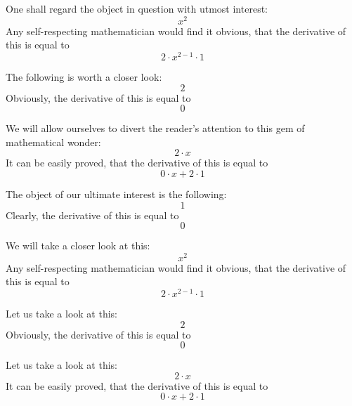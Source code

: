 \documentclass{article}
\begin{document}
One shall regard the object in question with utmost interest:
\begin{equation}
x ^{2 } 
\end{equation}
Any self-respecting mathematician would find it obvious, that the derivative of this is equal to
\begin{equation}
2 \cdot x ^{2 - 1 } \cdot 1 
\end{equation}

The following is worth a closer look:
\begin{equation}
2 
\end{equation}
Obviously, the derivative of this is equal to
\begin{equation}
0 
\end{equation}

We will allow ourselves to divert the reader's attention to this gem of mathematical wonder:
\begin{equation}
2 \cdot x 
\end{equation}
It can be easily proved, that the derivative of this is equal to
\begin{equation}
0 \cdot x + 2 \cdot 1 
\end{equation}

The object of our ultimate interest is the following:
\begin{equation}
1 
\end{equation}
Clearly, the derivative of this is equal to
\begin{equation}
0 
\end{equation}

We will take a closer look at this:
\begin{equation}
x ^{2 } 
\end{equation}
Any self-respecting mathematician would find it obvious, that the derivative of this is equal to
\begin{equation}
2 \cdot x ^{2 - 1 } \cdot 1 
\end{equation}

Let us take a look at this:
\begin{equation}
2 
\end{equation}
Obviously, the derivative of this is equal to
\begin{equation}
0 
\end{equation}

Let us take a look at this:
\begin{equation}
2 \cdot x 
\end{equation}
It can be easily proved, that the derivative of this is equal to
\begin{equation}
0 \cdot x + 2 \cdot 1 
\end{equation}
\end{document}

